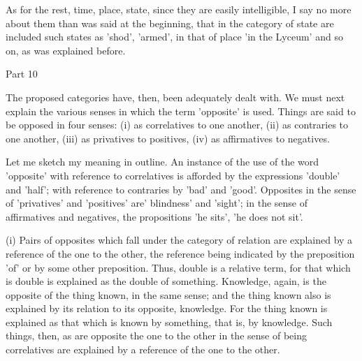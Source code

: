 As for the rest, time, place, state, since they are easily
intelligible, I say no more about them than was said at the beginning,
that in the category of state are included such states as 'shod',
'armed', in that of place 'in the Lyceum' and so on, as was explained
before.



Part 10

The proposed categories have, then, been adequately dealt with. We must
next explain the various senses in which the term 'opposite' is used.
Things are said to be opposed in four senses: (i) as correlatives to
one another, (ii) as contraries to one another, (iii) as privatives to
positives, (iv) as affirmatives to negatives.

Let me sketch my meaning in outline. An instance of the use of the word
'opposite' with reference to correlatives is afforded by the
expressions 'double' and 'half'; with reference to contraries by 'bad'
and 'good'. Opposites in the sense of 'privatives' and 'positives' are'
blindness' and 'sight'; in the sense of affirmatives and negatives, the
propositions 'he sits', 'he does not sit'.

(i) Pairs of opposites which fall under the category of relation are
explained by a reference of the one to the other, the reference being
indicated by the preposition 'of' or by some other preposition. Thus,
double is a relative term, for that which is double is explained as the
double of something. Knowledge, again, is the opposite of the thing
known, in the same sense; and the thing known also is explained by its
relation to its opposite, knowledge. For the thing known is explained
as that which is known by something, that is, by knowledge. Such
things, then, as are opposite the one to the other in the sense of
being correlatives are explained by a reference of the one to the other.

